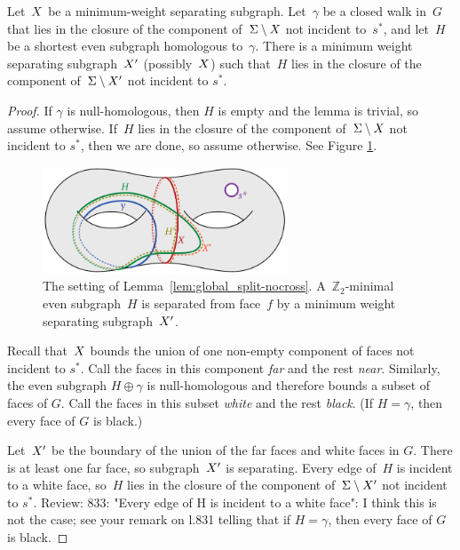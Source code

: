 \documentclass[letterpaper,review]{siamart190516}
\def\Z{\mathbb{Z}}
\def\rnote#1{\color{red}Review: #1 \color{black}}
\begin{document}
{\begin{lemma}
\label{lem:global_split-nocross}
Let~$X$ be a minimum-weight separating subgraph.
Let~$\gamma$ be a closed walk in~$G$ that lies in the closure of the component of~$\Sigma \setminus
X$ not incident to~$s^*$, and let~$H$
be a shortest even subgraph homologous to~$\gamma$.
There is a minimum weight separating subgraph~$X'$ (possibly~$X$) such
that~$H$ lies in the closure of the component of~$\Sigma \setminus X'$ not incident to $s^*$. 
\end{lemma}

\begin{proof}
If $\gamma$ is null-homologous, then $H$ is empty and the lemma is trivial, so assume otherwise.
If~$H$ lies in the closure of the component of~$\Sigma \setminus X$ not incident to $s^*$, then we are done, so assume otherwise.  See Figure \ref{fig:global_nonsep-vs-shortsep}. 

\begin{figure}[ht]
\centering
\includegraphics[height=1.25in]{Fig/nonsep-vs-shortsep-2}
\caption{The setting of Lemma~\ref{lem:global_split-nocross}. A~$\Z_2$-minimal even subgraph~$H$ is separated from face~$f$ by a minimum weight separating subgraph~$X'$.}
\label{fig:global_nonsep-vs-shortsep}
\end{figure}

Recall that~$X$ bounds the union of one non-empty component of faces not incident to
$s^*$.
Call the faces in this component \emph{far} and the rest \emph{near}.
Similarly, the even subgraph $H \oplus \gamma$ is null-homologous and therefore bounds a subset of
faces of $G$.
Call the faces in this subset \emph{white} and the rest \emph{black}.
(If $H = \gamma$, then every face of $G$ is black.)

Let~$X'$ be the boundary of the union of the far faces and white faces in $G$.
There is at least one far face, so subgraph~$X'$ is separating.
Every edge of~$H$ is incident to a white face, so~$H$ lies in the closure of the  component
of~$\Sigma \setminus X'$ not incident to $s^*$. \rnote{833: "Every edge of H is incident to a white face": I think this is not the case; see your remark on l.831 telling that if $H=\gamma$, then every face of $G$ is black. }


\end{proof}}
\end{document}
